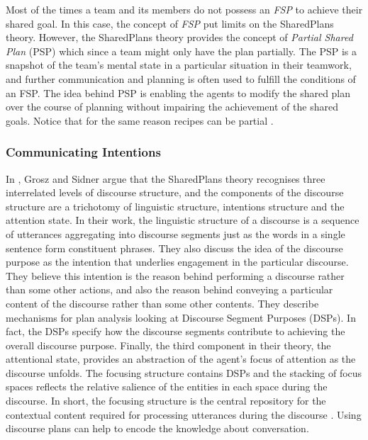 \documentclass[11pt]{article}
\begin{document}
Most of the times a team and its members do not possess an \textit{FSP} to
achieve their shared goal. In this case, the concept of \textit{FSP} put limits
on the SharedPlans theory. However, the SharedPlans theory provides the concept
of \textit{Partial Shared Plan} (PSP) which since a team might only have the
plan partially. The PSP is a snapshot of the team's mental state in a particular
situation in their teamwork, and further communication and planning is often
used to fulfill the conditions of an FSP. The idea behind PSP is enabling the
agents to modify the shared plan over the course of planning without impairing
the achievement of the shared goals. Notice that for the same reason recipes
can be partial \cite{grosz:collaboration, grosz:plans-discourse}.

\subsubsection{Communicating Intentions}

In \cite{grosz:plans-discourse}, Grosz and Sidner argue that the SharedPlans
theory recognises three interrelated levels of discourse structure, and the
components of the discourse structure are a trichotomy of linguistic structure,
intentions structure and the attention state. In their work, the linguistic
structure of a discourse is a sequence of utterances aggregating into discourse
segments just as the words in a single sentence form constituent phrases. They
also discuss the idea of the discourse purpose as the intention that underlies
engagement in the particular discourse. They believe this intention is the
reason behind performing a discourse rather than some other actions, and also
the reason behind conveying a particular content of the discourse rather than
some other contents. They describe mechanisms for plan analysis looking at
Discourse Segment Purposes (DSPs). In fact, the DSPs specify how the discourse
segments contribute to achieving the overall discourse purpose. Finally, the
third component in their theory, the attentional state, provides an abstraction
of the agent's focus of attention as the discourse unfolds. The focusing
structure contains DSPs and the stacking of focus spaces reflects the relative
salience of the entities in each space during the discourse. In short, the
focusing structure is the central repository for the contextual content required
for processing utterances during the discourse \cite{grosz:plans-discourse}.
Using discourse plans can help to encode the knowledge about conversation.\\
\end{document}

